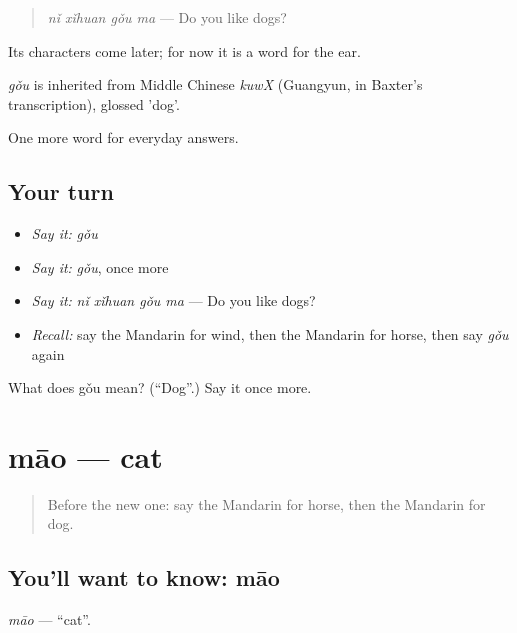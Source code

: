 \begin{quote}
\emph{nǐ xǐhuan gǒu ma} — Do you like dogs?
\end{quote}

Its characters come later; for now it is a word for the ear.

\begin{cousinweb}
\emph{gǒu} is inherited from Middle Chinese \emph{kuwX} (Guangyun, in Baxter's transcription), glossed 'dog'.
\end{cousinweb}

\begin{grammarlens}[title={What you've built}]
One more word for everyday answers.
\end{grammarlens}

\subsection*{Your turn}
\begin{itemize}
\raggedright
  \item \emph{Say it:} \emph{gǒu}
  \item \emph{Say it:} \emph{gǒu}, once more
  \item \emph{Say it:} \emph{nǐ xǐhuan gǒu ma} — Do you like dogs?
  \item \emph{Recall:} say the Mandarin for wind, then the Mandarin for horse, then say \emph{gǒu} again
\end{itemize}

\begin{tcolorbox}[breakable,colback=teal!4,colframe=teal!35!black,title={Before you move on}]
What does gǒu mean? (\textquotedblleft{}Dog\textquotedblright{}.) Say it once more.
\end{tcolorbox}
\section[māo]{māo — cat}

\label{lesson:ZH-C67-mao}



\begin{quote}
Before the new one: say the Mandarin for horse, then the Mandarin for dog.
\end{quote}

\subsection*{You'll want to know: māo}
\emph{māo} — \textquotedblleft{}cat\textquotedblright{}.

